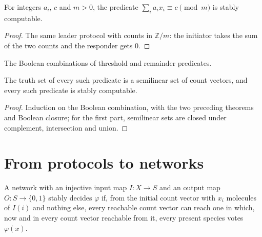 \begin{theorem}\label{thm:remainder}
\leanok{}
For integers $a_i$, $c$ and $m > 0$, the predicate $\sum_i a_i x_i \equiv c \pmod m$ is stably
computable.
\end{theorem}
\begin{proof}\leanok
The same leader protocol with counts in $\mathbb{Z}/m$: the initiator takes the sum of the two
counts and the responder gets $0$.
\end{proof}

\begin{definition}\label{def:semilinear}
\leanok{}
The Boolean combinations of threshold and remainder predicates.
\end{definition}

\begin{theorem}\label{thm:semilinear}
\leanok{}
The truth set of every such predicate is a semilinear set of count vectors, and every such
predicate is stably computable.
\end{theorem}
\begin{proof}\leanok
Induction on the Boolean combination, with the two preceding theorems and Boolean closure; for
the first part, semilinear sets are closed under complement, intersection and union.
\end{proof}

\section{From protocols to networks}
\begin{definition}\label{def:crn-stable}
\leanok{}
A network with an injective input map $I : X \to S$ and an output map $O : S \to \{0, 1\}$
stably decides $\varphi$ if, from the initial count vector with $x_i$ molecules of $I(i)$ and nothing
else, every reachable count vector can reach one in which, now and in every count vector reachable
from it, every present species votes $\varphi(x)$.
\end{definition}

